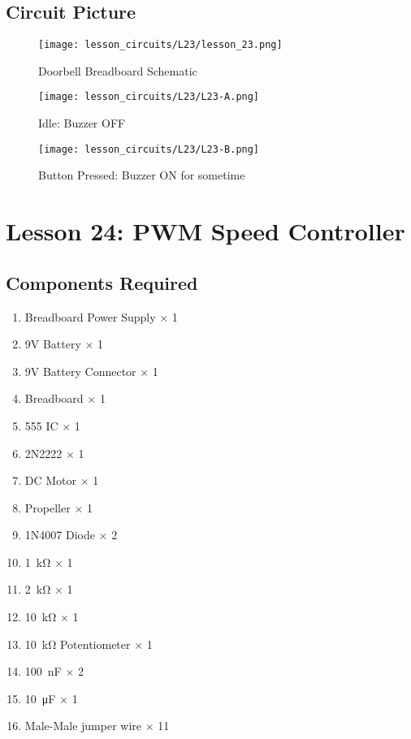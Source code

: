 \subsection{Circuit Picture}
\begin{figure}[!h]
    \centering
    \texttt{[image: lesson\_circuits/L23/lesson\_23.png]}
    \caption{Doorbell Breadboard Schematic}
    \label{fig:555_doorbell_sch}
\end{figure}
\begin{figure}[!h]
    \centering
    \texttt{[image: lesson\_circuits/L23/L23-A.png]}
    \caption{Idle: Buzzer OFF}
    \label{fig:555_doorbell_obb}
\end{figure}
\begin{figure}[!h]
    \centering
    \texttt{[image: lesson\_circuits/L23/L23-B.png]}
    \caption{Button Pressed: Buzzer ON for sometime}
    \label{fig:555_doorbell_obb1}
\end{figure}
\section{Lesson 24: PWM Speed Controller}
\subsection{Components Required}
\begin{enumerate}
    \item Breadboard Power Supply $\times$ 1
    \item 9V Battery $\times$ 1
    \item 9V Battery Connector $\times$ 1
    \item Breadboard $\times$ 1
    \item 555 IC $\times$ 1
    \item 2N2222 $\times$ 1
    \item DC Motor $\times$ 1
    \item Propeller $\times$ 1
    \item 1N4007 Diode $\times$ 2
    \item \SI{1}{\kilo\ohm} $\times$ 1
    \item \SI{2}{\kilo\ohm} $\times$ 1
    \item \SI{10}{\kilo\ohm} $\times$ 1
    \item \SI{10}{\kilo\ohm} Potentiometer $\times$ 1
    \item \SI{100}{\nano\farad} $\times$ 2
    \item \SI{10}{\micro\farad} $\times$ 1
    \item Male-Male jumper wire $\times$ 11
\end{enumerate}
